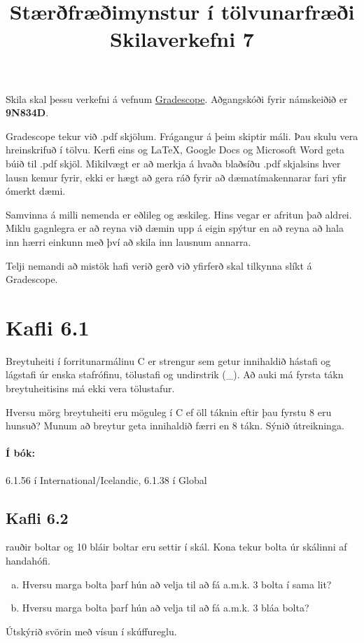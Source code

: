 \documentclass{article}
\title{Stærðfræðimynstur í tölvunarfræði \\ Skilaverkefni 7}
\author{}
\begin{document}
\maketitle

Skila skal þessu verkefni á vefnum \href{https://gradescope.com/courses/9487}{Gradescope}. Aðgangskóði fyrir námskeiðið er \textbf{9N834D}. 

Gradescope tekur við .pdf skjölum. Frágangur á þeim skiptir máli. Þau skulu vera hreinskrifuð í tölvu. Kerfi eins og \LaTeX, Google Docs og Microsoft Word geta búið til .pdf skjöl. Mikilvægt er að merkja á hvaða blaðsíðu .pdf skjalsins hver lausn kemur fyrir, ekki er hægt að gera ráð fyrir að dæmatímakennarar fari yfir ómerkt dæmi.

Samvinna á milli nemenda er eðlileg og æskileg. Hins vegar er afritun það aldrei. Miklu gagnlegra er að reyna við dæmin upp á eigin spýtur en að reyna að hala inn hærri einkunn með því að skila inn lausnum annarra.

Telji nemandi að mistök hafi verið gerð við yfirferð skal tilkynna slíkt á Gradescope.

\section{Kafli 6.1}

\question Breytuheiti í forritunarmálinu C er strengur sem getur innihaldið hástafi og lágstafi úr enska stafrófinu, tölustafi og undirstrik (\_). Að auki má fyrsta tákn breytuheitisins má ekki vera tölustafur.

Hversu mörg breytuheiti eru möguleg í C ef öll táknin eftir þau fyrstu 8 eru hunsuð? Munum að breytur geta innihaldið færri en 8 tákn. Sýnið útreikninga.

\paragraph{Í bók:} 6.1.56 í International/Icelandic, 6.1.38 í Global

\subsection{Kafli 6.2}

 rauðir boltar og 10 bláir boltar eru settir í skál. Kona tekur bolta úr skálinni af handahófi.

\begin{enumerate}[a)]
    \item Hversu marga bolta þarf hún að velja til að fá a.m.k. 3 bolta í sama lit?
    \item Hversu marga bolta þarf hún að velja til að fá a.m.k. 3 bláa bolta?
\end{enumerate}
Útskýrið svörin með vísun í skúffureglu.
\end{document}
